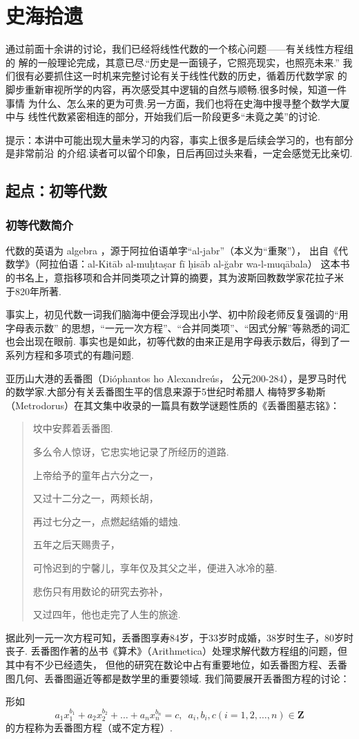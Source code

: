 \chapter{史海拾遗}

通过前面十余讲的讨论，我们已经将线性代数的一个核心问题——有关线性方程组的
解的一般理论完成，其意已尽.``历史是一面镜子，它照亮现实，也照亮未来.''
我们很有必要抓住这一时机来完整讨论有关于线性代数的历史，循着历代数学家
的脚步重新审视所学的内容，再次感受其中逻辑的自然与顺畅.很多时候，知道一件事情
为什么、怎么来的更为可贵.另一方面，我们也将在史海中搜寻整个数学大厦中与
线性代数紧密相连的部分，开始我们后一阶段更多``未竟之美''的讨论.

提示：本讲中可能出现大量未学习的内容，事实上很多是后续会学习的，也有部分是非常前沿
的介绍.读者可以留个印象，日后再回过头来看，一定会感觉无比亲切.

\section{起点：初等代数}
\subsection{初等代数简介}
代数的英语为 algebra ，源于阿拉伯语单字``al-jabr''（本义为``重聚''），
出自《代数学》（阿拉伯语：al-Kitāb al-muḫtaṣar fī ḥisāb al-ğabr wa-l-muqābala）
这本书的书名上，意指移项和合并同类项之计算的摘要，其为波斯回教数学家花拉子米
于820年所著.

事实上，初见代数一词我们脑海中便会浮现出小学、初中阶段老师反复强调的``用字母表示数''
的思想，``一元一次方程''、``合并同类项''、``因式分解''等熟悉的词汇也会出现在眼前.
事实也是如此，初等代数的由来正是用字母表示数后，得到了一系列方程和多项式的有趣问题.

亚历山大港的丢番图（Dióphantos ho Alexandreús，
公元200-284），是罗马时代的数学家.大部分有关丢番图生平的信息来源于5世纪时希腊人
梅特罗多勒斯（Metrodorus）在其文集中收录的一篇具有数学谜题性质的《丢番图墓志铭》：
\begin{quote}
    \kaishu
    坟中安葬着丢番图.

    多么令人惊讶，它忠实地记录了所经历的道路.

    上帝给予的童年占六分之一，

    又过十二分之一，两颊长胡，

    再过七分之一，点燃起结婚的蜡烛.

    五年之后天赐贵子，

    可怜迟到的宁馨儿，享年仅及其父之半，便进入冰冷的墓.

    悲伤只有用数论的研究去弥补，

    又过四年，他也走完了人生的旅途.
\end{quote}
据此列一元一次方程可知，丢番图享寿84岁，于33岁时成婚，38岁时生子，80岁时丧子.
丢番图作著的丛书《算术》（Arithmetica）处理求解代数方程组的问题，但其中有不少已经遗失，
但他的研究在数论中占有重要地位，如丢番图方程、丢番图几何、丢番图逼近等都是数学里的重要领域.
我们简要展开丢番图方程的讨论：
\begin{definition}
    形如
    \[a_1x_1^{b_1}+a_2x_2^{b_2}+\ldots+a_nx_n^{b_n}=c,\enspace a_i,b_i,c(i=1,2,\ldots,n)\in\mathbf{Z}\]
    的方程称为丢番图方程（或不定方程）.
\end{definition}

